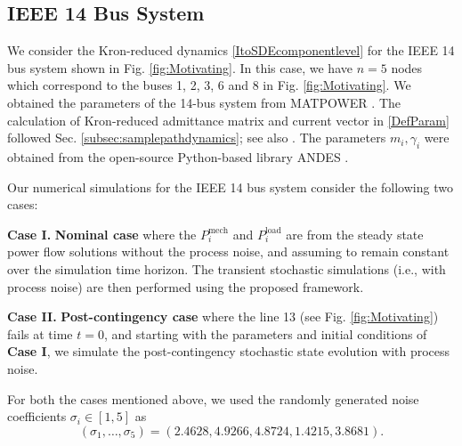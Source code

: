 \documentclass[10pt,twocolumn]{IEEEtran}
\begin{document}
\subsection{IEEE 14 Bus System}\label{subsec:NumSimIEEEBus}
We consider the Kron-reduced dynamics \eqref{ItoSDEcomponentlevel} for the IEEE 14 bus system shown in Fig. \ref{fig:Motivating}. In this case, we have $n=5$ nodes which correspond to the buses 1, 2, 3, 6 and 8 in Fig. \ref{fig:Motivating}. We obtained the parameters of the 14-bus system from MATPOWER \cite{zimmerman2010matpower}. The calculation of Kron-reduced admittance matrix and current vector in \eqref{DefParam} followed Sec.  \ref{subsec:samplepathdynamics}; see also \cite{dorfler2012kron}. The parameters $m_{i}, \gamma_{i}$ were obtained from the open-source Python-based
library ANDES \cite{cui2021andes}.

Our numerical simulations for the IEEE 14 bus system consider the following two cases:

\noindent\textbf{Case I.} \textbf{Nominal case} where the $P_{i}^{\text{mech}}$ and $P_{i}^{\text{load}}$ are from the steady state power flow solutions without the process noise, and assuming to remain constant over the simulation time horizon. The transient stochastic simulations (i.e., with process noise) are then performed using the proposed framework.

\noindent\textbf{Case II.} \textbf{Post-contingency case} where the line 13 (see Fig. \ref{fig:Motivating}) fails at time $t=0$, and starting with the parameters and initial conditions of \textbf{Case I}, we simulate the post-contingency stochastic state evolution with process noise. %


 

For both the cases mentioned above, we used the randomly generated noise coefficients $\sigma_{i}\in [1,5]$ as
\[(\sigma_{1},\hdots,\sigma_5) = \left(2.4628, 4.9266, 4.8724, 1.4215, 3.8681\right).\]
\end{document}
